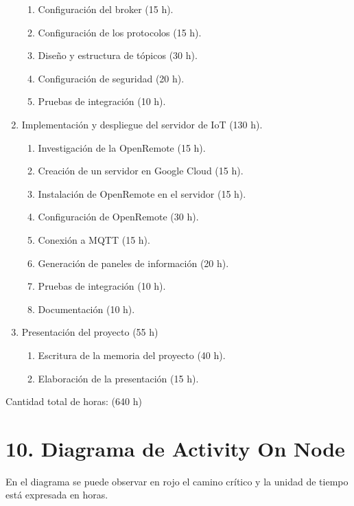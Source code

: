 \documentclass[
11pt, %
]{charter}
\begin{document}
\begin{enumerate}
\begin{enumerate}
	\item Configuración del broker (15 h).
	\item Configuración de los protocolos (15 h).
	\item Diseño y estructura de tópicos (30 h).
	\item Configuración de seguridad (20 h).
	\item Pruebas de integración (10 h).
	\end{enumerate}
\item Implementación y despliegue del servidor de IoT (130 h).
	\begin{enumerate}
	\item Investigación de la OpenRemote (15 h).
	\item Creación de un servidor en Google Cloud (15 h).
	\item Instalación de OpenRemote en el servidor (15 h).
	\item Configuración de OpenRemote (30 h).
	\item Conexión a MQTT (15 h).
	\item Generación de paneles de información (20 h).
	\item Pruebas de integración (10 h).
	\item Documentación (10 h).
	\end{enumerate}
\item Presentación del proyecto (55 h)
	\begin{enumerate}
	\item Escritura de la memoria del proyecto (40 h).
	\item Elaboración de la presentación (15 h).
	\end{enumerate}
\end{enumerate}

Cantidad total de horas: (640 h)


\section{10. Diagrama de Activity On Node}
\label{sec:AoN}

En el diagrama se puede observar en rojo el camino crítico y la unidad de tiempo está expresada en horas.
\end{document}
